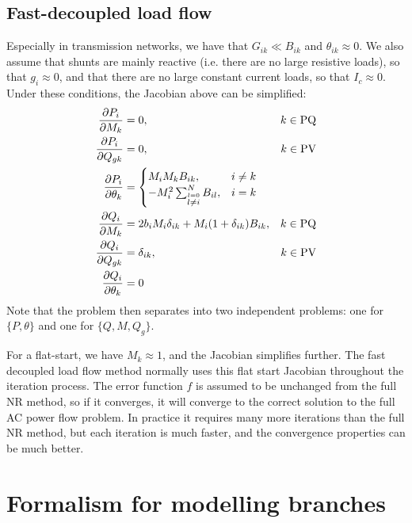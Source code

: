 \documentclass[11pt]{article}
\begin{document}
\subsection{Fast-decoupled load flow}
Especially in transmission networks, we have that $G_{ik} \ll B_{ik}$ and $\theta_{ik} \approx 0$. We also assume that shunts are mainly reactive (i.e. there are no large resistive loads), so that $g_i \approx 0$, and that there are no large constant current loads, so that $I_c \approx 0$. Under these conditions, the Jacobian above can be simplified:
\begin{align}
	\frac{\partial P_i}{\partial M_{k}} &= 0, & k \in \text{PQ} \notag \\
	\frac{\partial P_i}{\partial Q_{gk}} &= 0, &k \in \text{PV}\notag \\
	\frac{\partial P_i}{\partial \theta_k} &= 
		\begin{cases}
			M_{i}M_{k}B_{ik}, & i \ne k \\
			-M_{i}^2\sum_{\stackrel{l = 0}{l \ne i}}^NB_{il}, &i = k
		\end{cases} \notag \\
	\frac{\partial Q_i}{\partial M_{k}} &= 2b_iM_{i}\delta_{ik} + M_{i}(1 + \delta_{ik})B_{ik}, & k \in \text{PQ} \notag \\
	\frac{\partial Q_i}{\partial Q_{gk}} &= \delta_{ik}, & k \in \text{PV} \notag \\
	\frac{\partial Q_i}{\partial \theta_k} &= 0
\end{align}
Note that the problem then separates into two independent problems: one for $\{P, \theta\}$ and one for $\{Q, M, Q_g\}$. 

For a flat-start, we have $M_k \approx 1$, and the Jacobian simplifies further. The fast decoupled load flow method normally uses this flat start Jacobian throughout the iteration process. The error function $f$ is assumed to be unchanged from the full NR method, so if it converges, it will converge to the correct solution to the full AC power flow problem. In practice it requires many more iterations than the full NR method, but each iteration is much faster, and the convergence properties can be much better.

\section{Formalism for modelling branches}
\end{document}
